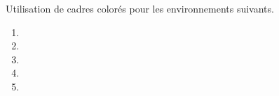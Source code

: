 \begin{tdocnew}
    \item Utilisation de cadres colorés pour les environnements suivants.
    \begin{enumerate}
    	\item {}
    	\item {}
    	\item {}
    	\item {}
    	\item {}
    \end{enumerate}
\end{tdocnew}
